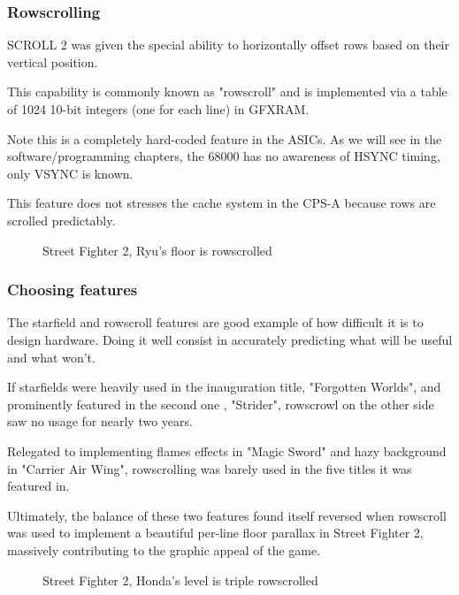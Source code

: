 \subsubsection{Rowscrolling}
SCROLL 2 was given the special ability to horizontally offset rows based on their vertical position. 

This capability is commonly known as "rowscroll" and is implemented via a table of 1024 10-bit integers (one for each line) in GFXRAM.

Note this is a completely hard-coded feature in the ASICs. As we will see in the software/programming chapters, the 68000 has no awareness of HSYNC timing, only VSYNC is known.

\begin{trivia}

This feature does not stresses the cache system in the CPS-A because rows are scrolled predictably.

\end{trivia}

\vfill
\begin{figure}[!b]
 \caption*{Street Fighter 2, Ryu's floor is rowscrolled}%
 \end{figure}%
\pagebreak

\subsubsection{Choosing features}

The starfield and rowscroll features are good example of how difficult it is to design hardware. Doing it well consist in accurately predicting what will be useful and what won't. 

If starfields were heavily used in the inauguration title, "Forgotten Worlds", and prominently featured in the second one , "Strider", rowscrowl on the other side saw no usage for nearly two years. 

Relegated to implementing flames effects in "Magic Sword" and hazy background in "Carrier Air Wing", rowscrolling was barely used in the five titles\cite{mame_cps1_video} it was featured in.

Ultimately, the balance of these two features found itself reversed when rowscroll was used to implement a beautiful per-line floor parallax in Street Fighter 2, massively contributing to the graphic appeal of the game.


\vfill
\begin{figure}[!b]
 \caption*{Street Fighter 2, Honda's level is triple rowscrolled}%
 \end{figure}%
\pagebreak








